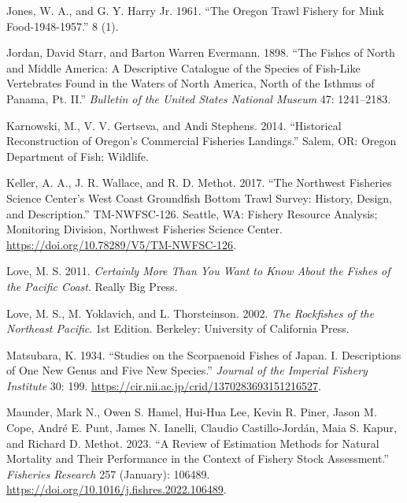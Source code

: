 \documentclass[
]{scrartcl}
\newlength{\cslhangindent}
\newenvironment{CSLReferences}[2] %
 {\begin{list}{}{%
  \setlength{\itemindent}{0pt}
  \setlength{\leftmargin}{0pt}
  \setlength{\parsep}{0pt}
  \ifodd #1
   \setlength{\leftmargin}{\cslhangindent}
   \setlength{\itemindent}{-1\cslhangindent}
  \fi
  \setlength{\itemsep}{#2\baselineskip}}}
 {\end{list}}
\begin{document}
\begin{CSLReferences}{1}{0}
Jones, W. A., and G. Y. Harry Jr. 1961. {``The {Oregon} {Trawl}
{Fishery} for {Mink} {Food}-1948-1957.''} 8 (1).

Jordan, David Starr, and Barton Warren Evermann. 1898. {``The Fishes of
{North} and {Middle} {America}: {A} Descriptive Catalogue of the Species
of Fish-Like Vertebrates Found in the Waters of {North} {America}, North
of the {Isthmus} of {Panama}, Pt. {II}.''} \emph{Bulletin of the United
States National Museum} 47: 1241--2183.

Karnowski, M., V. V. Gertseva, and Andi Stephens. 2014. {``Historical
{Reconstruction} of {Oregon}'s {Commercial} {Fisheries} {Landings}.''}
Salem, OR: Oregon Department of Fish; Wildlife.

Keller, A. A., J. R. Wallace, and R. D. Methot. 2017. {``The {N}orthwest
{F}isheries {S}cience {C}enter's West Coast Groundfish Bottom Trawl
Survey: History, Design, and Description.''} TM-NWFSC-126. Seattle, WA:
Fishery Resource Analysis; Monitoring Division, Northwest Fisheries
Science Center. \url{https://doi.org/10.78289/V5/TM-NWFSC-126}.

Love, M. S. 2011. \emph{Certainly {More} {Than} {You} {Want} to {Know}
{About} the {Fishes} of the {Pacific} {Coast}}. Really Big Press.

Love, M. S., M. Yoklavich, and L. Thorsteinson. 2002. \emph{The
{Rockfishes} of the {Northeast} {Pacific}}. 1st Edition. Berkeley:
University of California Press.

Matsubara, K. 1934. {``Studies on the Scorpaenoid Fishes of Japan. I.
Descriptions of One New Genus and Five New Species.''} \emph{Journal of
the Imperial Fishery Institute} 30: 199.
\url{https://cir.nii.ac.jp/crid/1370283693151216527}.

Maunder, Mark N., Owen S. Hamel, Hui-Hua Lee, Kevin R. Piner, Jason M.
Cope, André E. Punt, James N. Ianelli, Claudio Castillo-Jordán, Maia S.
Kapur, and Richard D. Methot. 2023. {``A Review of Estimation Methods
for Natural Mortality and Their Performance in the Context of Fishery
Stock Assessment.''} \emph{Fisheries Research} 257 (January): 106489.
\url{https://doi.org/10.1016/j.fishres.2022.106489}.


\end{CSLReferences}
\end{document}
